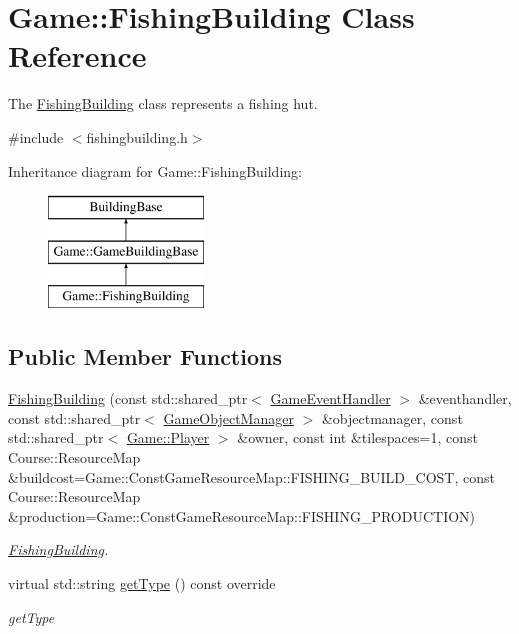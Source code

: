 \hypertarget{class_game_1_1_fishing_building}{\section{Game\-:\-:Fishing\-Building Class Reference}
\label{class_game_1_1_fishing_building}
}


The \hyperlink{class_game_1_1_fishing_building}{Fishing\-Building} class represents a fishing hut.  




{\ttfamily \#include $<$fishingbuilding.\-h$>$}

Inheritance diagram for Game\-:\-:Fishing\-Building\-:\begin{figure}[H]
\begin{center}
\leavevmode
\includegraphics[height=3.000000cm]{class_game_1_1_fishing_building}
\end{center}
\end{figure}
\subsection*{Public Member Functions}
\begin{DoxyCompactItemize}
\item 
\hyperlink{class_game_1_1_fishing_building_a5ab7cea4d687fffabb1cdcec90e5b16f}{Fishing\-Building} (const std\-::shared\-\_\-ptr$<$ \hyperlink{class_game_1_1_game_event_handler}{Game\-Event\-Handler} $>$ \&eventhandler, const std\-::shared\-\_\-ptr$<$ \hyperlink{class_game_1_1_game_object_manager}{Game\-Object\-Manager} $>$ \&objectmanager, const std\-::shared\-\_\-ptr$<$ \hyperlink{class_game_1_1_player}{Game\-::\-Player} $>$ \&owner, const int \&tilespaces=1, const Course\-::\-Resource\-Map \&buildcost=Game\-::\-Const\-Game\-Resource\-Map\-::\-F\-I\-S\-H\-I\-N\-G\-\_\-\-B\-U\-I\-L\-D\-\_\-\-C\-O\-S\-T, const Course\-::\-Resource\-Map \&production=Game\-::\-Const\-Game\-Resource\-Map\-::\-F\-I\-S\-H\-I\-N\-G\-\_\-\-P\-R\-O\-D\-U\-C\-T\-I\-O\-N)
\begin{DoxyCompactList}\small\item\em \hyperlink{class_game_1_1_fishing_building}{Fishing\-Building}. \end{DoxyCompactList}\item 
virtual std\-::string \hyperlink{class_game_1_1_fishing_building_a8e7af836ffde9b004fdf182fc88e2b50}{get\-Type} () const override
\begin{DoxyCompactList}\small\item\em get\-Type \end{DoxyCompactList}\end{DoxyCompactItemize}
